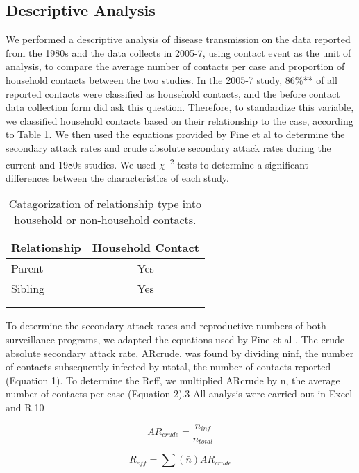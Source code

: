 \subsection{Descriptive Analysis}
We performed a descriptive analysis of disease transmission on the data reported from the 1980s and the data collects in 2005-7, using contact event as the unit of analysis, to compare the average number of contacts per case and proportion of household contacts between the two studies. In the 2005-7 study, 86\%** of all reported contacts were classified as household contacts, and the before contact data collection form did ask this question. Therefore, to standardize this variable, we classified household contacts based on their relationship to the case, according to Table 1. We then used the equations provided by Fine et al \cite{Fine1988} to determine the secondary attack rates and crude absolute secondary attack rates during the current and 1980s studies. We used $\chi$\ \textsuperscript{2} tests to determine a significant differences between the characteristics of each study.

\begin{table} 
\centering
\caption{Catagorization of relationship type into household or non-household contacts.} 
    \begin{tabular}{ l c }
    \toprule
        Relationship & Household Contact \\ 
        \midrule
        Parent & Yes \\ 
        Sibling & Yes \\ 
         &  \\ 
         &  \\ 
         \bottomrule
    \end{tabular} 
\end{table}

To determine the secondary attack rates and reproductive numbers of both surveillance programs, we adapted the equations used by Fine et al \cite{Fine1988}. 
The crude absolute secondary attack rate, ARcrude, was found by dividing ninf, the number of contacts subsequently infected by ntotal, the number of contacts reported (Equation 1). To determine the Reff, we multiplied ARcrude by n, the average number of contacts per case (Equation 2).3  All analysis were carried out in Excel and R.10

\begin{equation}
\label{eqn:equation 1}
AR_{crude}=\frac{n_{inf}}{n_{total}}
\end{equation}

\begin{equation}
\label{eqn:equation 2}
R_{eff}=\sum \left ( \bar{n} \right )AR_{crude}
\end{equation}
